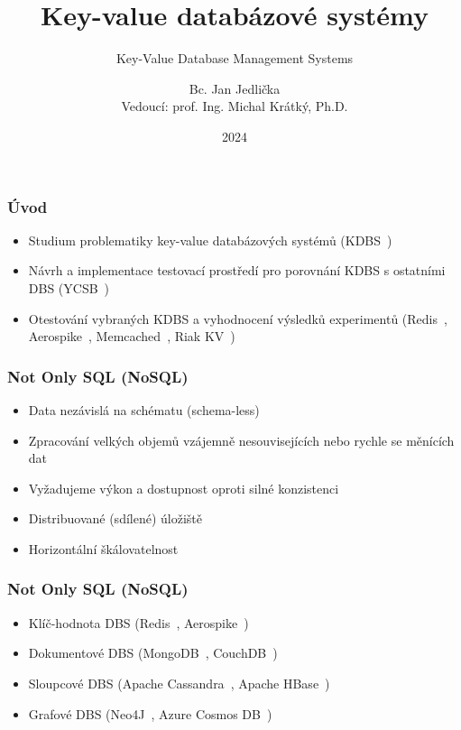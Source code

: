 \documentclass{beamer}
\title[Diplomová práce - KDBS]{Key-value databázové systémy}
\subtitle{Key-Value Database Management Systems}
\author[Bc. Jan Jedlička, JED0050]{Bc. Jan Jedlička \\ {\footnotesize Vedoucí: prof. Ing. Michal Krátký, Ph.D.}}
\institute[]{FEI, VŠB-TUO}
\date{2024}
\begin{document}
	
	\frame{\titlepage}
	
	\begin{frame}
		\frametitle{Úvod}
		
		\begin{itemize}
			\item Studium problematiky key-value databázových systémů (KDBS~\cite{amaz-key-value-db})
			\item Návrh a implementace testovací prostředí pro porovnání KDBS s ostatními DBS (YCSB~\cite{ycsb})
			\item Otestování vybraných KDBS a vyhodnocení výsledků experimentů (Redis~\cite{redis}, Aerospike~\cite{aerospike}, Memcached~\cite{memcached}, Riak KV~\cite{riak})
		\end{itemize}
		
	\end{frame}
	
	\begin{frame}
		\frametitle{Not Only SQL (NoSQL)}
		\begin{itemize}
			\item Data nezávislá na schématu (schema-less)
			\item Zpracování velkých objemů vzájemně nesouvisejících nebo rychle se měnících dat~\cite{mic-nosql}
			\item Vyžadujeme výkon a dostupnost oproti silné konzistenci
			\item Distribuované (sdílené) úložiště
			\item Horizontální škálovatelnost
		\end{itemize}	
	\end{frame}
	
	\begin{frame}
		\frametitle{Not Only SQL (NoSQL)}
		\begin{itemize}
			\item Klíč-hodnota DBS {\footnotesize(Redis~\cite{redis}, Aerospike~\cite{aerospike})}
			\item Dokumentové DBS {\footnotesize(MongoDB~\cite{mongodb}, CouchDB~\cite{couchdb})}
			\item Sloupcové DBS {\footnotesize(Apache Cassandra~\cite{cassandra}, Apache HBase~\cite{hbase})}
			\item Grafové DBS {\footnotesize(Neo4J~\cite{neo4j}, Azure Cosmos DB~\cite{azure-cosmos-db})}
		\end{itemize}	
	\end{frame}
	
\end{document}
